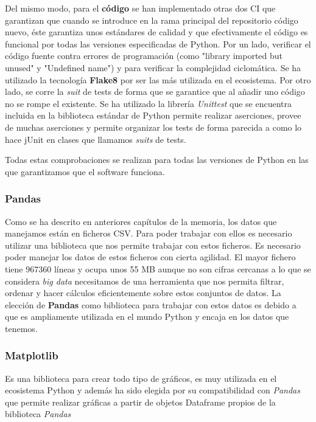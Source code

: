 Del mismo modo, para el \textbf{código} se han implementado otras dos CI que garantizan que cuando se introduce en la rama principal del repositorio código nuevo, éste garantiza unos estándares de calidad y que efectivamente el código es funcional por todas las versiones especificadas de Python. Por un lado, verificar el código fuente contra errores de programación (como "library imported but unused" y "Undefined name") y para verificar la complejidad ciclomática. Se ha utilizado la tecnología \cite{flake}\textbf{Flake8} por ser las más utilizada en el ecosistema.
Por otro lado, se corre la \textit{suit} de tests de forma que se garantice que al añadir uno código no se rompe el existente. Se ha utilizado la librería \textit{Unittest} que se encuentra incluida en la biblioteca estándar de Python permite realizar aserciones, provee de muchas aserciones y permite organizar los tests de forma parecida a como lo hace jUnit en clases que llamamos \textit{suits} de tests.

Todas estas comprobaciones se realizan para todas las versiones de Python en las que garantizamos que el software funciona.

\subsubsection{Pandas}
Como se ha descrito en anteriores capítulos de la memoria, los datos que manejamos están en ficheros CSV. Para poder trabajar con ellos es necesario utilizar una biblioteca que nos permite trabajar con estos ficheros. Es necesario poder manejar los datos de estos ficheros con cierta agilidad. El mayor fichero tiene 967360 líneas y ocupa unos 55 MB aunque no son cifras cercanas a lo que se considera \textit{big data} necesitamos de una herramienta que nos permita filtrar, ordenar y hacer cálculos eficientemente sobre estos conjuntos de datos. La elección de \textbf{Pandas} como biblioteca para trabajar con estos datos es debido a que es ampliamente utilizada en el mundo Python y encaja en los datos que tenemos.

\subsubsection{Matplotlib}
Es una biblioteca para crear todo tipo de gráficos, es muy utilizada en el ecosistema Python y además ha sido elegida por su compatibilidad con \textit{Pandas} que permite realizar gráficas a partir de objetos Dataframe propios de la biblioteca \textit{Pandas}

